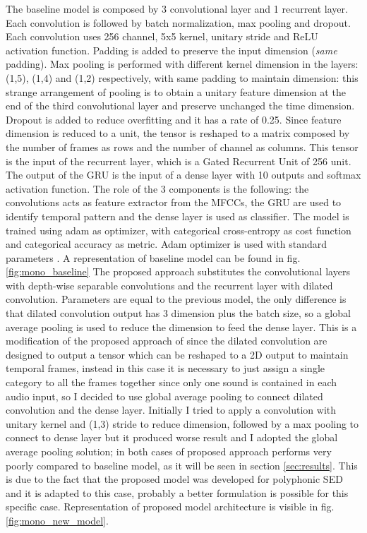 \documentclass{article}
\begin{document}
The baseline model is composed by 3 convolutional layer and 1 recurrent layer. Each convolution is followed by batch normalization, max pooling and dropout. Each convolution uses 256 channel, 5x5 kernel, unitary stride and ReLU activation function. Padding is added to preserve the input dimension (\textit{same} padding). Max pooling is performed with different kernel dimension in the layers: (1,5), (1,4) and (1,2) respectively, with same padding to maintain dimension: this strange arrangement of pooling is to obtain a unitary feature dimension at the end of the third convolutional layer and preserve unchanged the time dimension. Dropout is added to reduce overfitting and it has a rate of 0.25. Since feature dimension is reduced to a unit, the tensor is reshaped to a matrix composed by the number of frames as rows and the number of channel as columns. This tensor is the input of the recurrent layer, which is a Gated Recurrent Unit of 256 unit. The output of the GRU is the input of a dense layer with 10 outputs and softmax activation function. The role of the 3 components is the following: the convolutions acts as feature extractor from the MFCCs, the GRU are used to identify temporal pattern and the dense layer is used as classifier. The model is trained using adam as optimizer, with categorical cross-entropy as cost function and categorical accuracy as metric. Adam optimizer is used with standard parameters \cite{kingma2017adam}. A representation of baseline model can be found in fig. \ref{fig:mono_baseline}\newline
The proposed approach substitutes the convolutional layers with depth-wise separable convolutions and the recurrent layer with dilated convolution. Parameters are equal to the previous model, the only difference is that dilated convolution output has 3 dimension plus the batch size, so a global average pooling is used to reduce the dimension to feed the dense layer. This is a modification of the proposed approach of \cite{drossos2020sound} since the dilated convolution are designed to output a tensor which can be reshaped to a 2D output to maintain temporal frames, instead in this case it is necessary to just assign a single category to all the frames together since only one sound is contained in each audio input, so I decided to use global average pooling to connect dilated convolution and the dense layer. Initially I tried to apply a convolution with unitary kernel and (1,3) stride to reduce dimension, followed by a max pooling to connect to dense layer but it produced worse result and I adopted the global average pooling solution; in both cases of proposed approach performs very poorly compared to baseline model, as it will be seen in section \ref{sec:results}. This is due to the fact that the proposed model was developed for polyphonic SED and it is adapted to this case, probably a better formulation is possible for this specific case. Representation of proposed model architecture is visible in fig. \ref{fig:mono_new_model}.
\end{document}
